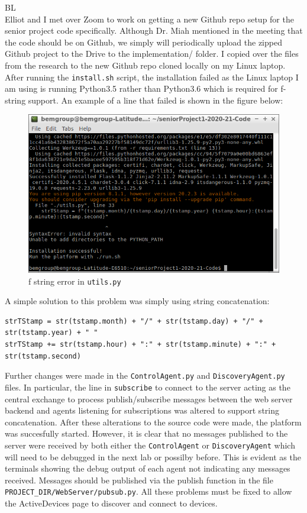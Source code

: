 \documentclass[fontsize=11pt, %
                             paper=letter, %
                             openany, %
                             captions=tableheading,
                             index=totoc,
                             hyperref]{labbook}
\begin{document}
\begin{addmargin}[0cm]{0cm}


BL\\
Elliot and I met over Zoom to work on getting a new Github repo setup for the senior project code specifically. Although Dr. Miah mentioned in the meeting that the code should be on Github, we simply will periodically upload the zipped Github project to the Drive to the implementation/ folder. I copied over the files from the research to the new Github repo cloned locally on my Linux laptop. After running the \texttt{install.sh} script, the installation failed as the Linux laptop I am using is running Python3.5 rather than Python3.6 which is required for f-string support. An example of a line that failed is shown in the figure below:
\begin{figure}[H]
\centering
\includegraphics[scale=0.6]{figs/img/installSyntaxError}
\caption{f string error in \texttt{utils.py}}
\end{figure}
A simple solution to this problem was simply using string concatenation:
\begin{Verbatim}
strTStamp = str(tstamp.month) + "/" + str(tstamp.day) + "/" + str(tstamp.year) + " "
strTStamp += str(tstamp.hour) + ":" + str(tstamp.minute) + ":" + str(tstamp.second)
\end{Verbatim}
Further changes were made in the \texttt{ControlAgent.py} and \texttt{DiscoveryAgent.py} files. In particular, the line in \texttt{subscribe} to connect to the server acting as the central exchange to process publish/subscribe messages between the web server backend and agents listening for subscriptions was altered to support string concatenation. After these alterations to the source code were made, the platform was succesfully started. However, it is clear that no messages published to the server were received by both either the \texttt{ControlAgent} or \texttt{DiscoveryAgent} which will need to be debugged in the next lab or possilby before. This is evident as the terminals showing the debug output of each agent not indicating any messages received. Messages should be published via the publish function in the file \texttt{PROJECT\_DIR/WebServer/pubsub.py}. All these problems must be fixed to allow the ActiveDevices page to discover and connect to devices.
\end{addmargin}
\end{document}

